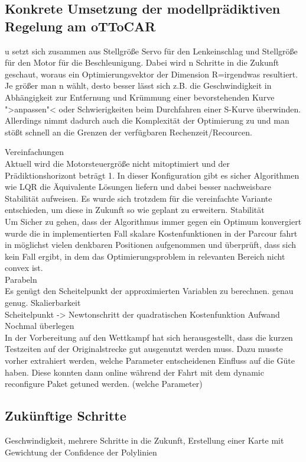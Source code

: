 \subsection{Konkrete Umsetzung der modellprädiktiven Regelung am oTToCAR}
u setzt sich zusammen aus Stellgröße Servo für den Lenkeinschlag und Stellgröße für den Motor für die Beschleunigung. Dabei wird n Schritte in die Zukunft geschaut, woraus ein Optimierungsvektor der Dimension R=irgendwas resultiert. Je größer man n wählt, desto besser lässt sich z.B. die Geschwindigkeit in Abhängigkeit zur Entfernung und Krümmung einer bevorstehenden Kurve ">anpassen"< oder Schwierigkeiten beim Durchfahren einer S-Kurve überwinden. Allerdings nimmt dadurch auch die Komplexität der Optimierung zu und man stößt schnell an die Grenzen der verfügbaren Rechenzeit/Recourcen.

Vereinfachungen\\
Aktuell wird die Motorsteuergröße nicht mitoptimiert und der Prädiktionshorizont beträgt 1. In dieser Konfiguration gibt es sicher Algorithmen wie LQR die Äquivalente Lösungen liefern und dabei besser nachweisbare Stabilität aufweisen. Es wurde sich trotzdem für die vereinfachte Variante entschieden, um diese in Zukunft so wie geplant zu erweitern.
Stabilität\\
Um Sicher zu gehen, dass der Algorithmus immer gegen ein Optimum konvergiert wurde die in implementierten Fall skalare Kostenfunktionen in der Parcour fahrt in möglichst vielen denkbaren Positionen aufgenommen und überprüft, dass sich kein Fall ergibt, in dem das Optimierungsproblem in relevanten Bereich nicht convex ist.
\\
Parabeln
\\
Es genügt den Scheitelpunkt der approximierten Variablen zu berechnen. genau genug.
Skalierbarkeit\\
Scheitelpunkt -> Newtonschritt der quadratischen Kostenfunktion
Aufwand\\
Nochmal überlegen\\
In der Vorbereitung auf den Wettkampf hat sich herausgestellt, dass die kurzen Testzeiten auf der Originalstrecke gut ausgenutzt werden muss. Dazu musste vorher extrahiert werden, welche Parameter entscheidenen Einfluss auf die Güte haben. Diese konnten dann online während der Fahrt mit dem dynamic reconfigure Paket getuned werden. (welche Parameter)\\
\subsection{Zukünftige Schritte}
Geschwindigkeit, mehrere Schritte in die Zukunft, Erstellung einer Karte mit Gewichtung der Confidence der Polylinien